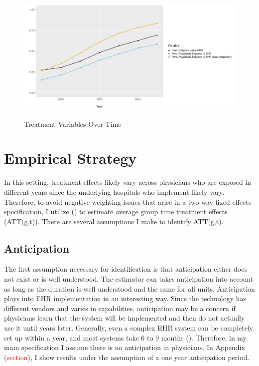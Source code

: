 \documentclass[11pt]{article}
\begin{document}
\begin{figure}[ht]
\centering
    \caption{Treatment Variables Over Time}
    \includegraphics[scale=.6]{Objects/sum_stats_year.pdf}
    \label{fig:treatmentgraph}
\end{figure}


\section{Empirical Strategy}

In this setting, treatment effects likely vary across physicians who are exposed in different years since the underlying hospitals who implement likely vary. Therefore, to avoid negative weighting issues that arise in a two way fixed effects specification, I utilize \citeauthor{callaway2021difference} (\citeyear{callaway2021difference}) to estimate average group time treatment effects (ATT(g,t)). There are several assumptions I make to identify ATT(g,t).

\subsection{Anticipation}

 The first assumption necessary for identification is that anticipation either does not exist or is well understood. The estimator can takes anticipation into account as long as the duration is well understood and the same for all units. Anticipation plays into EHR implementation in an interesting way. Since the technology has different vendors and varies in capabilities, anticipation may be a concern if physicians learn that the system will be implemented and then do not actually use it until years later. Generally, even a complex EHR system can be completely set up within a year, and most systems take 6 to 9 months (\cite{uzialko_2021}). Therefore, in my main specification I assume there is no anticipation in physicians. In Appendix (\textcolor{red}{section}), I show results under the assumption of a one year anticipation period. 
\end{document}
